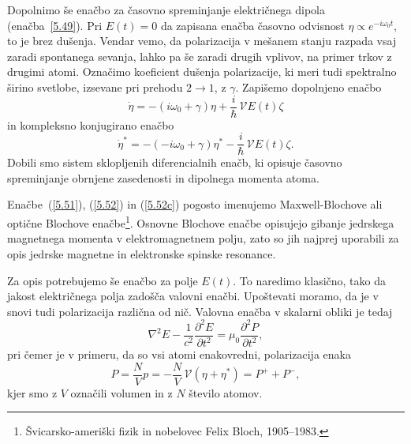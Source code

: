Dopolnimo še enačbo za časovno spreminjanje električnega dipola 
(enačba~\ref{5.49}). Pri $E(t)=0$ da zapisana enačba časovno odvisnost 
$\eta \propto e^{-i \omega_0 t}$, to je brez dušenja. Vendar vemo, da
polarizacija v mešanem stanju razpada vsaj zaradi spontanega sevanja, lahko
pa še zaradi drugih vplivov, na primer trkov z drugimi atomi. Označimo
koeficient dušenja polarizacije, ki meri tudi spektralno širino svetlobe, 
izsevane pri prehodu $2\rightarrow 1$, z $\gamma$. Zapišemo
dopolnjeno enačbo
\begin{equation}  
\label{5.52}
\dot{\eta}=- \left(i \omega_0+\gamma\right)\eta+\frac{i}{\hbar}\,\mathcal{V} E(t) \zeta
\end{equation}
in kompleksno konjugirano enačbo
\begin{equation}  
\label{5.52c}
\dot{\eta}^*=-\left(-i \omega_0+\gamma\right)\eta^*-\frac{i}{\hbar}\,\mathcal{V}E(t) \zeta.
\end{equation}
Dobili smo sistem sklopljenih diferencialnih enačb, ki opisuje časovno
spreminjanje obrnjene zasedenosti in dipolnega momenta atoma. 
\begin{remark}
 Enačbe~(\ref{5.51}), (\ref{5.52}) in (\ref{5.52c}) pogosto imenujemo 
 Maxwell-Blochove ali optične Blochove enačbe\footnote{Švicarsko-ameriški fizik 
 in nobelovec Felix Bloch, 1905--1983.}. Osnovne Blochove enačbe opisujejo gibanje 
 jedrskega magnetnega  momenta v elektromagnetnem polju, zato so jih najprej uporabili za opis 
 jedrske magnetne in elektronske spinske resonance. 
\end{remark}

Za opis potrebujemo še enačbo za polje $E(t)$. To naredimo klasično, tako da
jakost električnega polja zadošča valovni enačbi. Upoštevati moramo, 
da je v snovi tudi polarizacija različna od nič. 
Valovna enačba v skalarni obliki je tedaj
\begin{equation}  
\label{5.54}
\nabla^2 E-\frac{1}{c^2}\frac{\partial^2 E}{\partial t^2}=\mu_0 \frac{\partial^2 P}{\partial t^2},
\end{equation}
pri čemer je v primeru, da so vsi atomi enakovredni, polarizacija enaka
\begin{equation}  
\label{5.53}
P=\frac{N}{V}p = -\frac{N}{V}\,\mathcal{V}\left(\eta+\eta^{\ast}\right)=P^+ + P^-,
\end{equation}
kjer smo z $V$ označili volumen in z $N$ število atomov.


